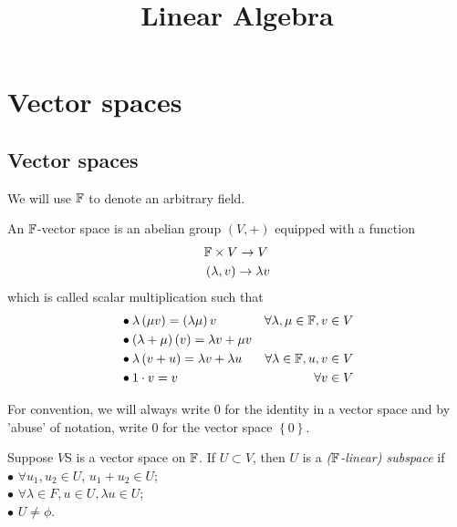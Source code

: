 \documentclass[a4paper]{article}
\begin{document}
\title{Linear Algebra}

\maketitle

\newpage

\tableofcontents

\newpage

\section{Vector spaces}

\subsection{Vector spaces}

\begin{notation}
We will use $\mathbb{F}$ to denote an arbitrary field.
\end{notation}

\begin{defi}
An $\mathbb{F}$-vector space is an abelian group $\left(V,+\right)$ equipped with a function
\begin{equation*}
\begin{aligned}
&\mathbb{F} \times V\to V\\
&\left(\lambda,v\right) \to \lambda v
\end{aligned}
\end{equation*}
which is called scalar multiplication such that
\begin{equation*}
\begin{aligned}
&\bullet \lambda\left(\mu v\right) = \left(\lambda \mu\right) v &\forall \lambda,\mu \in \mathbb{F}, v\in V\\
&\bullet \left(\lambda+\mu\right)\left(v\right) = \lambda v+\mu v&\\
&\bullet \lambda\left(v+u\right) = \lambda v+\lambda u &\forall \lambda \in \mathbb{F}, u,v\in V\\
&\bullet 1\cdot v = v & \forall v\in V
\end{aligned}
\end{equation*}
\end{defi}

For convention, we will always write $0$ for the identity in a vector space and by 'abuse' of notation, write $0$ for the vector space $\left\{0\right\}$.

\begin{defi}
Suppose $V$S is a vector space on $\mathbb{F}$. If $U \subset V$, then $U$ is a \emph{($\mathbb{F}$-linear) subspace} if \\
$\bullet$ $\forall u_1,u_2 \in U$, $u_1+u_2 \in U$;\\
$\bullet$ $\forall \lambda \in F, u \in U, \lambda u \in U$;\\
$\bullet$ $U \neq \phi$.
\end{defi}
\end{document}
